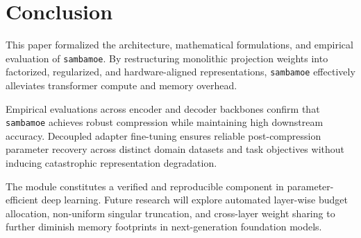 \section{Conclusion}
This paper formalized the architecture, mathematical formulations, and empirical evaluation of \texttt{sambamoe}. By restructuring monolithic projection weights into factorized, regularized, and hardware-aligned representations, \texttt{sambamoe} effectively alleviates transformer compute and memory overhead.

Empirical evaluations across encoder and decoder backbones confirm that \texttt{sambamoe} achieves robust compression while maintaining high downstream accuracy. Decoupled adapter fine-tuning ensures reliable post-compression parameter recovery across distinct domain datasets and task objectives without inducing catastrophic representation degradation.

The module constitutes a verified and reproducible component in parameter-efficient deep learning. Future research will explore automated layer-wise budget allocation, non-uniform singular truncation, and cross-layer weight sharing to further diminish memory footprints in next-generation foundation models.
